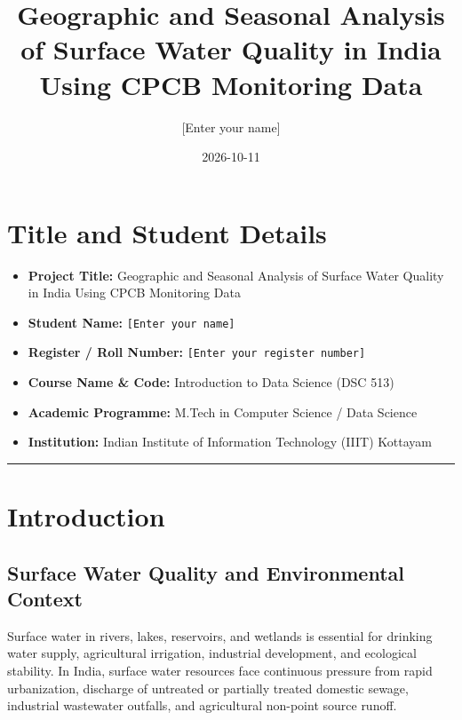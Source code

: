 \documentclass[
]{article}
\title{Geographic and Seasonal Analysis of Surface Water Quality in
India Using CPCB Monitoring Data}
\author{{[}Enter your name{]}}
\date{2026-10-11}
\providecommand{\tightlist}{%
  \setlength{\itemsep}{0pt}\setlength{\parskip}{0pt}}
\begin{document}
\maketitle

{
\setcounter{tocdepth}{3}
\tableofcontents
}
\section{Title and Student Details}\label{title-and-student-details}

\begin{itemize}
\tightlist
\item
  \textbf{Project Title:} Geographic and Seasonal Analysis of Surface
  Water Quality in India Using CPCB Monitoring Data
\item
  \textbf{Student Name:} \texttt{{[}Enter\ your\ name{]}}
\item
  \textbf{Register / Roll Number:}
  \texttt{{[}Enter\ your\ register\ number{]}}
\item
  \textbf{Course Name \& Code:} Introduction to Data Science (DSC 513)
\item
  \textbf{Academic Programme:} M.Tech in Computer Science / Data Science
\item
  \textbf{Institution:} Indian Institute of Information Technology
  (IIIT) Kottayam
\end{itemize}

\begin{center}\rule{0.5\linewidth}{0.5pt}\end{center}

\section{Introduction}\label{introduction}

\subsection{Surface Water Quality and Environmental
Context}\label{surface-water-quality-and-environmental-context}

Surface water in rivers, lakes, reservoirs, and wetlands is essential
for drinking water supply, agricultural irrigation, industrial
development, and ecological stability. In India, surface water resources
face continuous pressure from rapid urbanization, discharge of untreated
or partially treated domestic sewage, industrial wastewater outfalls,
and agricultural non-point source runoff.
\end{document}
